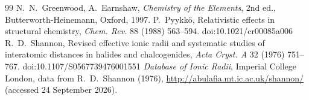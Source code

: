 \documentclass[11pt]{article}
\theoremstyle{definition}\newtheorem{definition}[theorem]{Definition}
\theoremstyle{remark}\newtheorem{remark}[theorem]{Remark}
\begin{document}
\begin{thebibliography}{99}
 N.~N.~Greenwood, A.~Earnshaw, \emph{Chemistry of the Elements}, 2nd ed., Butterworth-Heinemann, Oxford, 1997.
 P.~Pyykk\"o, Relativistic effects in structural chemistry, \emph{Chem. Rev.} 88 (1988) 563--594. doi:10.1021/cr00085a006
 R.~D.~Shannon, Revised effective ionic radii and systematic studies of interatomic distances in halides and chalcogenides, \emph{Acta Cryst. A} 32 (1976) 751--767. doi:10.1107/S0567739476001551
 \emph{Database of Ionic Radii}, Imperial College London, data from R.~D.~Shannon (1976), \url{http://abulafia.mt.ic.ac.uk/shannon/} (accessed 24 September 2026).
\end{thebibliography}
\end{document}
